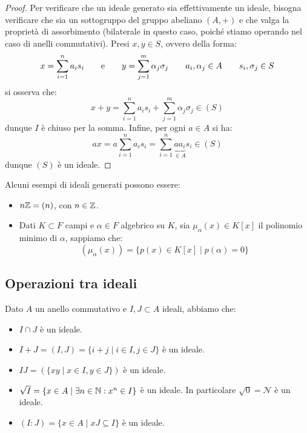 \documentclass[11pt]{scrartcl}
\begin{document}
\begin{proof}
    Per verificare che un ideale generato sia effettivamente un ideale, bisogna verificare che sia un sottogruppo del gruppo abeliano $(A,+)$ e che valga la proprietà di assorbimento (bilaterale in questo caso,
    poiché stiamo operando nel caso di anelli commutativi). Presi $x,y \in S$, ovvero della forma:
        \[ x = \sum_{i = 1}^n a_is_i \qquad \text e \qquad y = \sum_{j=1}^m\alpha_j \sigma_j \qquad a_i,\alpha_j \in A \qquad s_i,\sigma_j \in S 
            \]
    si osserva che:
        \[ x + y = \sum_{i = 1}^n a_is_i + \sum_{j=1}^m\alpha_j \sigma_j \in (S)
            \]
    dunque $I$ è chiuso per la somma. Infine, per ogni $a \in A$ si ha:
        \[ ax = a\sum_{i = 1}^n a_is_i = \sum_{i = 1}^n \underbrace{aa_i}_{\in A}s_i \in (S)
            \]
    dunque $(S)$ è un ideale.
\end{proof}

\begin{example}
    Alcuni esempi di ideali generati possono essere:
    \begin{itemize}
        \item $n\mathbb Z = (n)$, con $n \in \mathbb Z$.
        \item Dati $K \subset F$ campi e $\alpha \in F$ algebrico su $K$, sia $\mu_{\alpha}(x) \in K[x]$ il polinomio minimo di $\alpha$, sappiamo che:
            \[ (\mu_{\alpha}(x)) = \{p(x) \in K[x] \mid p(\alpha) = 0\}
                \]
    \end{itemize}
\end{example}


\newpage
\subsection{Operazioni tra ideali}
\begin{proposition}
    Dato $A$ un anello commutativo e $I,J \subset A$ ideali, abbiamo che:
    \begin{itemize}
        \item $I \cap J$ è un ideale.
        \item $I + J = (I,J) = \{i + j \mid i \in I, j \in J\}$ è un ideale.
        \item $IJ = (\{xy \mid x \in I, y \in J\})$ è un ideale.
        \item $\sqrt{I} = \{x \in A \mid \exists n \in \mathbb N : x^n \in I\}$ è un ideale. In particolare $\sqrt{0} = \mathcal{N}$ è un ideale.
        \item $(I : J) = \{x \in A \mid xJ \subseteq I\}$ è un ideale.
    \end{itemize}
\end{proposition}
\end{document}
